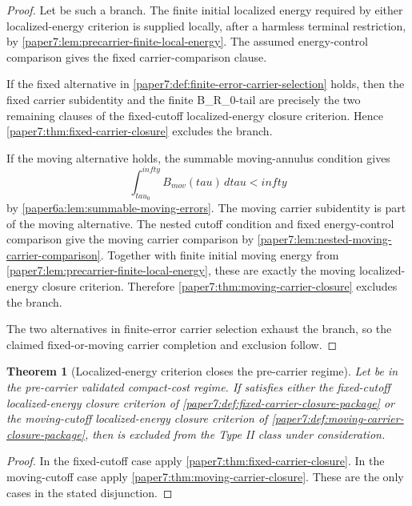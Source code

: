 \documentclass[11pt]{amsart}
\def\({}%
\def\){}%
\def\mathrm#1{#1}%
\def\tau{tau}%
\def\infty{infty}%
\theoremstyle{plain}
\newtheorem{theorem}{Theorem}[section]
\theoremstyle{definition}
\theoremstyle{remark}
\begin{document}
\begin{proof}
Let \(\omega\) be such a branch.  The finite initial localized energy required
by either localized-energy criterion is supplied locally, after a harmless
terminal restriction, by
\cref{paper7:lem:precarrier-finite-local-energy}.  The assumed energy-control
comparison gives the fixed carrier-comparison clause.
\par
If the fixed alternative in
\cref{paper7:def:finite-error-carrier-selection} holds, then the fixed
carrier subidentity and the finite \(B_{R_0}\)-tail are precisely the two
remaining clauses of the fixed-cutoff localized-energy closure criterion.  Hence
\cref{paper7:thm:fixed-carrier-closure} excludes the branch.
\par
If the moving alternative holds, the summable moving-annulus condition gives
\[
  \int_{\tau_0}^{\infty}B_{\mathrm{mov}}(\tau)\,d\tau<\infty
\]
by \cref{paper6a:lem:summable-moving-errors}.  The moving carrier subidentity
is part of the moving alternative.  The nested cutoff condition and fixed
energy-control comparison give the moving carrier comparison by
\cref{paper7:lem:nested-moving-carrier-comparison}.  Together with finite
initial moving energy from
\cref{paper7:lem:precarrier-finite-local-energy}, these are exactly the moving
localized-energy closure criterion.  Therefore
\cref{paper7:thm:moving-carrier-closure} excludes the branch.
\par
The two alternatives in finite-error carrier selection exhaust the branch, so
the claimed fixed-or-moving carrier completion and exclusion follow.
\end{proof}

\begin{theorem}[Localized-energy criterion closes the pre-carrier regime]
\label{paper7:thm:carrier-package-closes-precarrier}
Let \(\omega\) be in the pre-carrier validated compact-cost regime.  If
\(\omega\) satisfies either the fixed-cutoff localized-energy closure criterion of
\cref{paper7:def:fixed-carrier-closure-package} or the moving-cutoff
localized-energy closure criterion of \cref{paper7:def:moving-carrier-closure-package}, then
\(\omega\) is excluded from the Type II class under consideration.
\end{theorem}

\begin{proof}
In the fixed-cutoff case apply
\cref{paper7:thm:fixed-carrier-closure}.  In the moving-cutoff case apply
\cref{paper7:thm:moving-carrier-closure}.  These are the only cases in the
stated disjunction.
\end{proof}
\end{document}

